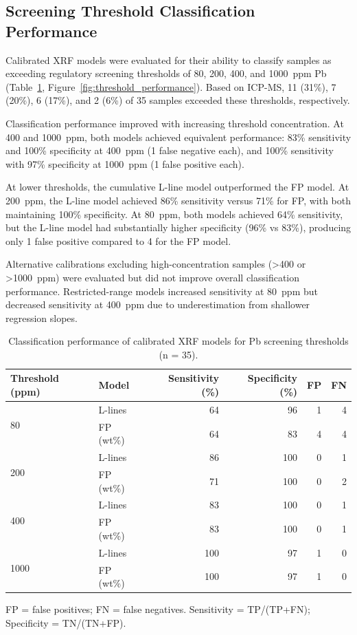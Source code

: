 \documentclass[12pt,letterpaper]{article}
\begin{document}
\subsection{Screening Threshold Classification Performance}

Calibrated XRF models were evaluated for their ability to classify samples as exceeding regulatory screening thresholds of 80, 200, 400, and 1000~ppm Pb (Table~\ref{tab:threshold_classification}, Figure~\ref{fig:threshold_performance}). Based on ICP-MS, 11 (31\%), 7 (20\%), 6 (17\%), and 2 (6\%) of 35 samples exceeded these thresholds, respectively.

Classification performance improved with increasing threshold concentration. At 400 and 1000~ppm, both models achieved equivalent performance: 83\% sensitivity and 100\% specificity at 400~ppm (1 false negative each), and 100\% sensitivity with 97\% specificity at 1000~ppm (1 false positive each).

At lower thresholds, the cumulative L-line model outperformed the FP model. At 200~ppm, the L-line model achieved 86\% sensitivity versus 71\% for FP, with both maintaining 100\% specificity. At 80~ppm, both models achieved 64\% sensitivity, but the L-line model had substantially higher specificity (96\% vs 83\%), producing only 1 false positive compared to 4 for the FP model.

Alternative calibrations excluding high-concentration samples (>400 or >1000~ppm) were evaluated but did not improve overall classification performance. Restricted-range models increased sensitivity at 80~ppm but decreased sensitivity at 400~ppm due to underestimation from shallower regression slopes.

\begin{table}[htbp]
\centering
\caption{Classification performance of calibrated XRF models for Pb screening thresholds (n = 35).}
\label{tab:threshold_classification}
\begin{tabular}{llrrrr}
\toprule
Threshold (ppm) & Model & Sensitivity (\%) & Specificity (\%) & FP & FN \\
\midrule
\multirow{2}{*}{80} & L-lines & 64 & 96 & 1 & 4 \\
 & FP (wt\%) & 64 & 83 & 4 & 4 \\
\midrule
\multirow{2}{*}{200} & L-lines & 86 & 100 & 0 & 1 \\
 & FP (wt\%) & 71 & 100 & 0 & 2 \\
\midrule
\multirow{2}{*}{400} & L-lines & 83 & 100 & 0 & 1 \\
 & FP (wt\%) & 83 & 100 & 0 & 1 \\
\midrule
\multirow{2}{*}{1000} & L-lines & 100 & 97 & 1 & 0 \\
 & FP (wt\%) & 100 & 97 & 1 & 0 \\
\bottomrule
\end{tabular}
\begin{flushleft}
\small{FP = false positives; FN = false negatives. Sensitivity = TP/(TP+FN); Specificity = TN/(TN+FP).}
\end{flushleft}
\end{table}
\end{document}
